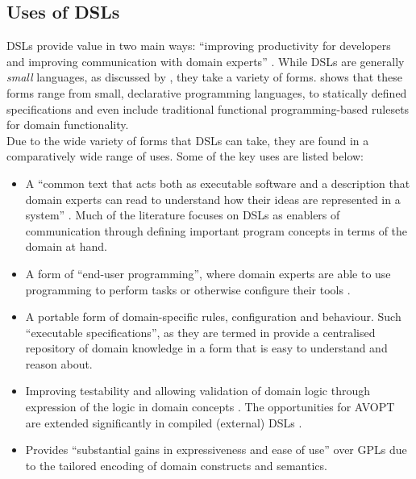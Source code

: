 

\subsection{Uses of DSLs} %
\label{sub:uses_of_dsls}
DSLs provide value in two main ways: ``improving productivity for developers and improving communication with domain experts'' \citep{fowler2010domain}. 
While DSLs are generally \textit{small} languages, as discussed by \citet{van2000domain}, they take a variety of forms.
\citet{fowler2010domain} shows that these forms range from small, declarative programming languages, to statically defined specifications and even include traditional functional programming-based rulesets for domain functionality.\\

Due to the wide variety of forms that DSLs can take, they are found in a comparatively wide range of uses.
Some of the key uses are listed below:
\begin{itemize}
    \item A ``common text that acts both as executable software and a description that domain experts can read to understand how their ideas are represented in a system'' \citep{fowler2010domain}.
    Much of the literature focuses on DSLs as enablers of communication through defining important program concepts in terms of the domain at hand.
    \item A form of ``end-user programming'', where domain experts are able to use programming to perform tasks or otherwise configure their tools \citep{van2000domain}.
    \item A portable form of domain-specific rules, configuration and behaviour. 
    Such ``executable specifications'', as they are termed in \citet{fabry2015taxonomy} provide a centralised repository of domain knowledge in a form that is easy to understand and reason about. 
    \item Improving testability and allowing validation of domain logic through expression of the logic in domain concepts \citep{van2000domain}.
    The opportunities for AVOPT are extended significantly in compiled (external) DSLs \citep{Mernik:2005:DDL:1118890.1118892}.
    \item Provides ``substantial gains in expressiveness and ease of use'' \citep[pg. 2]{Mernik:2005:DDL:1118890.1118892} over GPLs due to the tailored encoding of domain constructs and semantics. 
\end{itemize}

